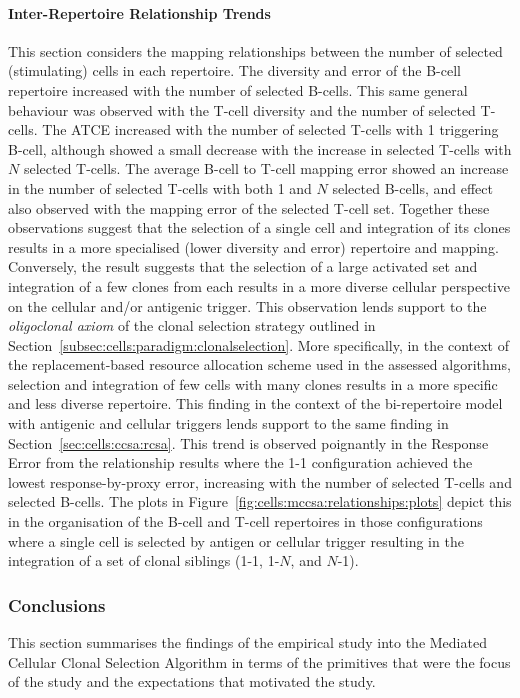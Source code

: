 \paragraph{Inter-Repertoire Relationship Trends}
This section considers the mapping relationships between the number of selected (stimulating) cells in each repertoire.
The diversity and error of the B-cell repertoire increased with the number of selected B-cells. This same general behaviour was observed with the T-cell diversity and the number of selected T-cells. The ATCE increased with the number of selected T-cells with 1 triggering B-cell, although showed a small decrease with the increase in selected T-cells with $N$ selected T-cells.
The average B-cell to T-cell mapping error showed an increase in the number of selected T-cells with both 1 and $N$ selected B-cells, and effect also observed with the mapping error of the selected T-cell set. 
Together these observations suggest that the selection of a single cell and integration of its clones results in a more specialised (lower diversity and error) repertoire and mapping. Conversely, the result suggests that the selection of a large activated set and integration of a few clones from each results in a more diverse cellular perspective on the cellular and/or antigenic trigger. 
This observation lends support to the \emph{oligoclonal axiom} of the clonal selection strategy outlined in Section~\ref{subsec:cells:paradigm:clonalselection}. More specifically, in the context of the replacement-based resource allocation scheme used in the assessed algorithms, selection and integration of few cells with many clones results in a more specific and less diverse repertoire. This finding in the context of the bi-repertoire model with antigenic and cellular triggers lends support to the same finding in Section~\ref{sec:cells:ccsa:rcsa}.
This trend is observed poignantly in the Response Error from the relationship results where the 1-1 configuration achieved the lowest response-by-proxy error, increasing with the number of selected T-cells and selected B-cells. The plots in Figure~\ref{fig:cells:mccsa:relationships:plots} depict this in the organisation of the B-cell and T-cell repertoires in those configurations where a single cell is selected by antigen or cellular trigger resulting in the integration of a set of clonal siblings (1-1, 1-$N$, and $N$-1).


%
%
\subsubsection{Conclusions}
This section summarises the findings of the empirical study into the Mediated Cellular Clonal Selection Algorithm in terms of the primitives that were the focus of the study and the expectations that motivated the study.


